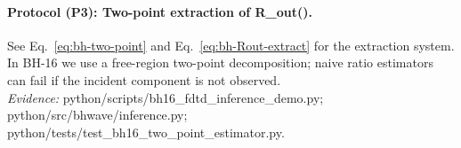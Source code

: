 \paragraph{Protocol (P3): Two-point extraction of R_out(\omega).}
\noindent See Eq.~\eqref{eq:bh-two-point} and Eq.~\eqref{eq:bh-Rout-extract} for the extraction system.\\
\noindent In BH-16 we use a free-region two-point decomposition; naive ratio estimators can fail if the incident component is not observed.\\
\noindent\textit{Evidence:} python/scripts/bh16_fdtd_inference_demo.py; python/src/bhwave/inference.py; python/tests/test_bh16_two_point_estimator.py.
